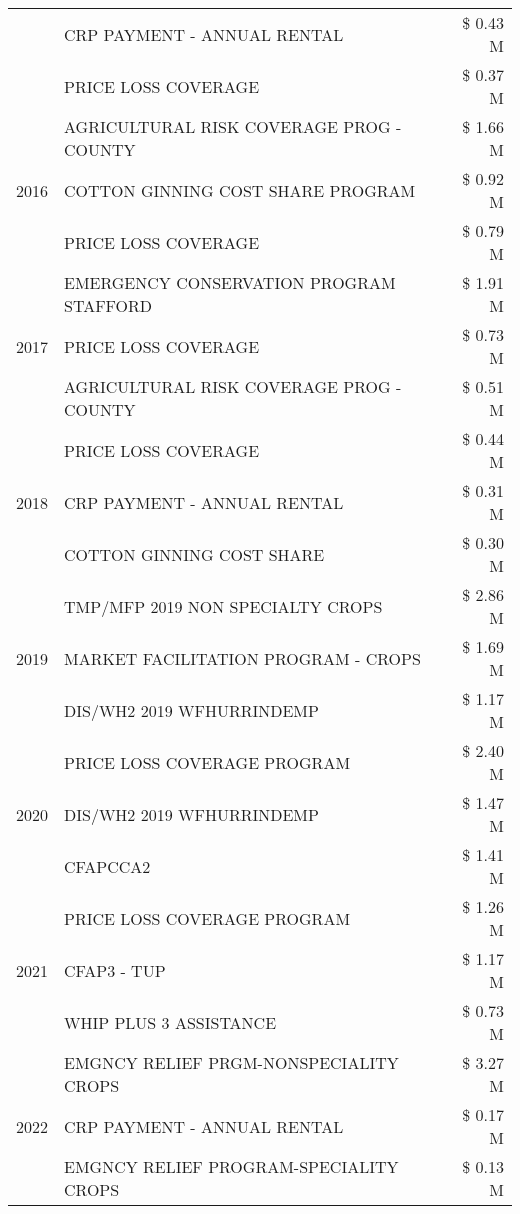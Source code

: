 \begin{tabular}{llr}
 & CRP PAYMENT - ANNUAL RENTAL & \$ 0.43 M \\
 & PRICE LOSS COVERAGE & \$ 0.37 M \\
\cline{1-3}
\multirow[t]{3}{*}{2016} & AGRICULTURAL RISK COVERAGE PROG - COUNTY & \$ 1.66 M \\
 & COTTON GINNING COST SHARE PROGRAM & \$ 0.92 M \\
 & PRICE LOSS COVERAGE & \$ 0.79 M \\
\cline{1-3}
\multirow[t]{3}{*}{2017} & EMERGENCY CONSERVATION PROGRAM STAFFORD & \$ 1.91 M \\
 & PRICE LOSS COVERAGE & \$ 0.73 M \\
 & AGRICULTURAL RISK COVERAGE PROG - COUNTY & \$ 0.51 M \\
\cline{1-3}
\multirow[t]{3}{*}{2018} & PRICE LOSS COVERAGE & \$ 0.44 M \\
 & CRP PAYMENT - ANNUAL RENTAL & \$ 0.31 M \\
 & COTTON GINNING COST SHARE & \$ 0.30 M \\
\cline{1-3}
\multirow[t]{3}{*}{2019} & TMP/MFP 2019 NON SPECIALTY CROPS & \$ 2.86 M \\
 & MARKET FACILITATION PROGRAM - CROPS & \$ 1.69 M \\
 & DIS/WH2 2019 WFHURRINDEMP & \$ 1.17 M \\
\cline{1-3}
\multirow[t]{3}{*}{2020} & PRICE LOSS COVERAGE PROGRAM & \$ 2.40 M \\
 & DIS/WH2 2019 WFHURRINDEMP & \$ 1.47 M \\
 & CFAPCCA2 & \$ 1.41 M \\
\cline{1-3}
\multirow[t]{3}{*}{2021} & PRICE LOSS COVERAGE PROGRAM & \$ 1.26 M \\
 & CFAP3 - TUP & \$ 1.17 M \\
 & WHIP PLUS 3 ASSISTANCE & \$ 0.73 M \\
\cline{1-3}
\multirow[t]{3}{*}{2022} & EMGNCY RELIEF PRGM-NONSPECIALITY CROPS & \$ 3.27 M \\
 & CRP PAYMENT - ANNUAL RENTAL & \$ 0.17 M \\
 & EMGNCY RELIEF PROGRAM-SPECIALITY CROPS & \$ 0.13 M \\
\cline{1-3}
\bottomrule
\end{tabular}
